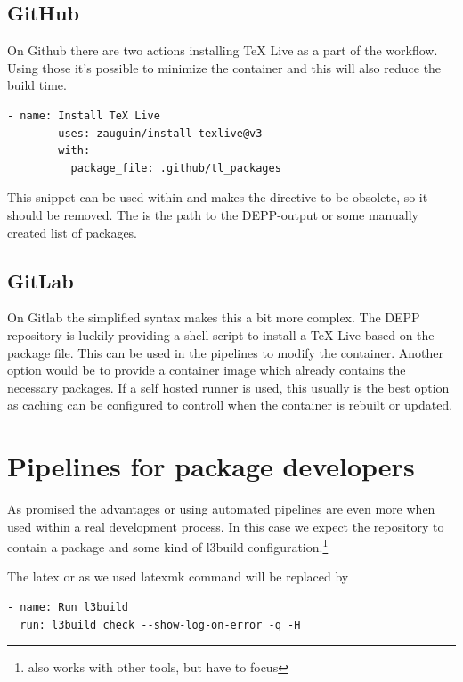 \documentclass[final]{ltugboat}
\newcommand*{\directive}[1]{\textbf{\detokenize{#1}}}
\begin{document}
\subsection{GitHub}

On Github there are two actions installing TeX Live as a part of the workflow.
Using those it's possible to minimize the container and this will also reduce the build time.

\begin{verbatim}
- name: Install TeX Live
        uses: zauguin/install-texlive@v3
        with:
          package_file: .github/tl_packages
\end{verbatim}

This snippet can be used within \directive{steps:} and makes the \directive{container:} directive to be obsolete, so it should be removed.
The \directive{package_file:} is the path to the DEPP-output or some manually created list of packages.

 \subsection{GitLab}

 On Gitlab the simplified syntax makes this a bit more complex.
 The DEPP repository is luckily providing a shell script to install a TeX Live based on the package file.
 This can be used in the pipelines to modify the container.
 Another option would be to provide a container image which already contains the necessary packages.
 If a self hosted runner is used, this usually is the best option as caching can be configured to controll when the container is rebuilt or updated.

\section{Pipelines for package developers}

As promised the advantages or using automated pipelines are even more when used within a real development process.
In this case we expect the repository to contain a package and some kind of l3build configuration.\footnote{also works with other tools, but have to focus}

The latex or as we used latexmk command will be replaced by

\begin{verbatim}
- name: Run l3build
  run: l3build check --show-log-on-error -q -H
\end{verbatim}
\end{document}
